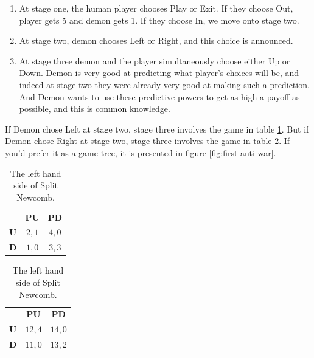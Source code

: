 \documentclass[
  12pt,
]{article}
\providecommand{\tightlist}{%
  \setlength{\itemsep}{0pt}\setlength{\parskip}{0pt}}
\begin{document}
\begin{enumerate}
\def\labelenumi{\arabic{enumi}.}
\tightlist
\item
  At stage one, the human player chooses Play or Exit. If they choose Out, player gets 5 and demon gets 1. If they choose In, we move onto stage two.
\item
  At stage two, demon chooses Left or Right, and this choice is announced.
\item
  At stage three demon and the player simultaneously choose either Up or Down. Demon is very good at predicting what player's choices will be, and indeed at stage two they were already very good at making such a prediction. And Demon wants to use these predictive powers to get as high a payoff as possible, and this is common knowledge.
\end{enumerate}

If Demon chose Left at stage two, stage three involves the game in table \ref{tab:left-anti-war}. But if Demon chose Right at stage two, stage three involves the game in table \ref{tab:right-anti-war}. If you'd prefer it as a game tree, it is presented in figure \ref{fig:first-anti-war}.

\renewcommand{\arraystretch}{1.3}   
\begin{table}

\caption{\label{tab:left-anti-war}The left hand side of Split Newcomb.}
\centering \vspace{6pt}
\begin{tabular}[t]{>{}r>{}c>{}c}

\textbf{} & \textbf{PU} & \textbf{PD}\\

\textbf{U} & $2, 1$ & $4, 0$\\
\textbf{D} & $1, 0$ & $3, 3$\\

\end{tabular}
\end{table}

\renewcommand{\arraystretch}{1.3}   
\begin{table}

\caption{\label{tab:right-anti-war}The left hand side of Split Newcomb.}
\centering \vspace{6pt}
\begin{tabular}[t]{>{}r>{}c>{}c}

\textbf{} & \textbf{PU} & \textbf{PD}\\

\textbf{U} & $12, 4$ & $14, 0$\\
\textbf{D} & $11, 0$ & $13, 2$\\

\end{tabular}
\end{table}
\end{document}
